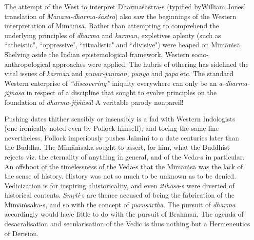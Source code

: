 The attempt of the West to interpret Dharmaśāstra-s (typified by\break William Jones’ translation of \textit{Mānava-dharma-śāstra}) also saw the beginnings of the Western interpretation of Mīmāṁsā. Rather than attempting to comprehend the underlying principles of \textit{dharma} and \textit{karman}, expletives aplenty (such as ``atheistic", ``oppressive", ``ritualistic" and ``divisive") were heaped on Mīmāṁsā. Shelving aside the Indian epistemological framework, Western socio-anthropological approaches were applied. The hubris of othering has sidelined the vital issues of \textit{karman} and \textit{punar-janman}, \textit{puṇya} and \textit{pāpa} etc. The standard Western enterprise of \textit{“discovering”} iniquity everywhere can only be an \textit{a-dharma-jijñāsā} in respect of a discipline that sought to evolve principles on the foundation of \textit{dharma-jijñāsā}! A veritable parody nonpareil!

Pushing dates thither sensibly or insensibly is a fad with Western Indologists (one ironically noted even by Pollock himself); and toeing the same line nevertheless, Pollock imperiously pushes Jaimini to a date centuries later than the Buddha. The Mīmāṁsaka sought to assert, for him, what the Buddhist rejects viz. the eternality of anything in general, and of the Veda-s in particular. An offshoot of the timelessness of the Veda-s that the Mīmāṁsā  was the lack of the sense of history. History was not so much to be unknown as to be denied. Vedicization is for inspiring ahistoricality, and even \hbox{\textit{itihāsa}-s} were diverted of historical contents. \textit{Smṛti}-s are thence accused of being the fabrication of the Mīmāṁsaka-s, and so with the concept of \textit{puruṣārtha}. The pursuit of \textit{dharma} accordingly would have little to do with the pursuit of Brahman. The agenda of desacralisation and secularisation of the Vedic is thus nothing but a Hermeneutics of Derision.

